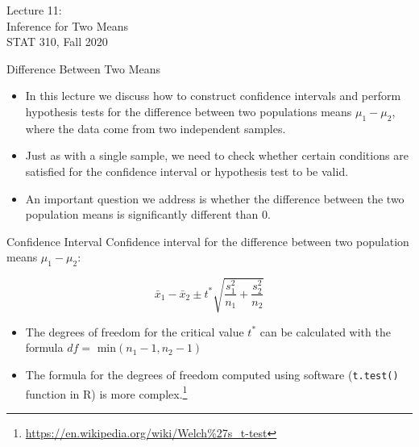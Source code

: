 \documentclass[11pt, fleqn]{beamer}\usepackage[]{graphicx}\usepackage[]{color}
\begin{document}
\begin{frame}
\large
Lecture 11:\\
Inference for Two Means\\
STAT 310, Fall 2020
\normalsize
\end{frame}

\begin{frame}{Difference Between Two Means}
\begin{itemize}
\item In this lecture we discuss how to construct confidence intervals and perform hypothesis tests for the difference between two populations means $\mu_1 - \mu_2$, where the data come from two independent samples.
\vspace{10pt}
\item Just as with a single sample, we need to check whether certain conditions are satisfied for the confidence interval or hypothesis test to be valid. 
\vspace{10pt}
\item An important question we address is whether the difference between the two population means is significantly different than 0.
\end{itemize}
\end{frame}

\begin{frame}{Confidence Interval}
Confidence interval for the difference between two population means $\mu_1 - \mu_2$:


$$\bar{x}_1 - \bar{x}_2 \pm t^* \sqrt{\frac{s_1^2}{n_1} + \frac{s_2^2}{n_2}}$$
\vspace{0.75cm}

\begin{itemize}
\item The degrees of freedom for the critical value $t^*$ can be calculated with the formula $df=$ min$(n_1-1, n_2-1)$  
\item The formula for the degrees of freedom computed using software (\texttt{t.test()} function in R) is more complex.\footnote{\url{https://en.wikipedia.org/wiki/Welch\%27s_t-test}}
\end{itemize}
\end{frame}
\end{document}

